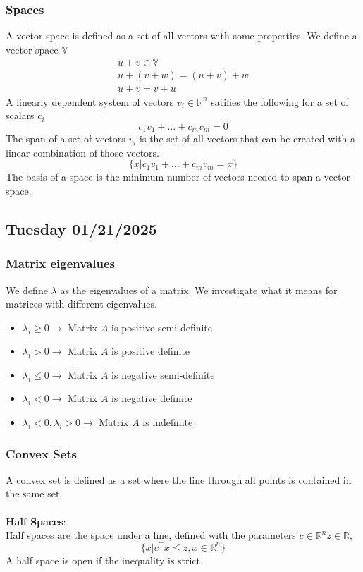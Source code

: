 \subsubsection{Spaces}
A vector space is defined as a set of all vectors with some properties. We define a vector space $\mathbb{V}$
\begin{gather}
    u + v \in \mathbb{V} \\
    u + (v +w) = (u+v) + w \\
    u + v = v+ u 
\end{gather}
A linearly dependent system of vectors $v_i \in \mathbb{R}^n$ satifies the following for a set of scalars $c_i$
\begin{equation}
    c_1 v_1 + \dots + c_m v_m = 0
\end{equation}
The span of a set of vectors $v_i$ is the set of all vectors that can be created with a linear combination of those vectors.
\begin{equation}
    \{ x | c_1 v_1 + \dots + c_m  v_m = x  \}
\end{equation}
The basis of a space is the minimum number of vectors needed to span a vector space.

\subsection{Tuesday 01/21/2025}
\subsubsection{Matrix eigenvalues}
We define $\lambda$ as the eigenvalues of a matrix. We investigate what it means for matrices with different eigenvalues.
\begin{itemize}
  \item $\lambda_i \geq 0 \to $ Matrix $A$ is positive semi-definite
  \item $\lambda_i > 0 \to $ Matrix $A$ is positive definite
  \item $\lambda_i \leq 0 \to $ Matrix $A$ is negative semi-definite
  \item $\lambda_i < 0 \to $ Matrix $A$ is negative definite
  \item $\lambda_i < 0, \lambda_i > 0 \to $ Matrix $A$ is  indefinite
\end{itemize}

\subsubsection{Convex Sets}
A convex set is defined as a set where the line through all points is contained in the same set.
\\ \\
\textbf{Half Spaces}: 
\\
Half spaces are the space under a line, defined with the parameters $c \in \mathbb{R}^n z \in \mathbb{R}$,  
\begin{equation}
  \{ x | c^\top x \leq z, x \in \mathbb{R}^n \}
\end{equation}
A half space is open if the inequality is strict.

